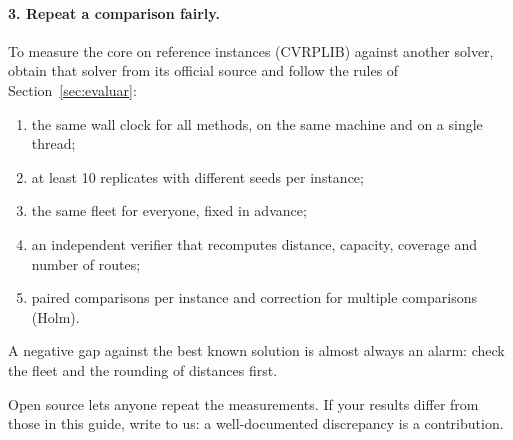 \documentclass[11pt,a4paper]{article}
\begin{document}
\paragraph{3. Repeat a comparison fairly.} To measure the core on reference instances (CVRPLIB)
against another solver, obtain that solver from its official source and follow the rules of
Section~\ref{sec:evaluar}:
\begin{enumerate}[leftmargin=1.5em]
\item the same wall clock for all methods, on the same machine and on a single thread;
\item at least 10 replicates with different seeds per instance;
\item the same fleet for everyone, fixed in advance;
\item an independent verifier that recomputes distance, capacity, coverage and number of routes;
\item paired comparisons per instance and correction for multiple comparisons (Holm).
\end{enumerate}
A negative gap against the best known solution is almost always an alarm: check the fleet and the
rounding of distances first.

\begin{ideaclave}
Open source lets anyone repeat the measurements. If your results differ from those in this guide,
write to us: a well-documented discrepancy is a contribution.
\end{ideaclave}




\appendix
\end{document}
